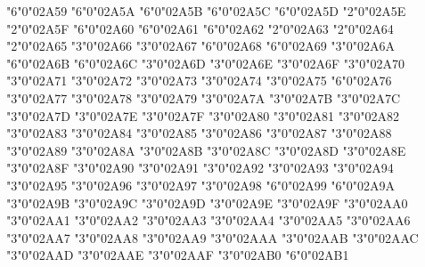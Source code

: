 \mchardef\veeonwedge"6"0"02A59
\mchardef\wedgemidvert"6"0"02A5A
\mchardef\veemidvert"6"0"02A5B
\mchardef\midbarwedge"6"0"02A5C
\mchardef\midbarvee"6"0"02A5D
\mchardef\doublebarwedge"2"0"02A5E
\mchardef\wedgebar"2"0"02A5F
\mchardef\wedgedoublebar"6"0"02A60
\mchardef\varveebar"6"0"02A61
\mchardef\doublebarvee"6"0"02A62
\mchardef\veedoublebar"2"0"02A63
\mchardef\dsub"2"0"02A64
\mchardef\rsub"2"0"02A65
\mchardef\eqdot"3"0"02A66
\mchardef\dotequiv"3"0"02A67
\mchardef\equivVert"6"0"02A68
\mchardef\equivVvert"6"0"02A69
\mchardef\dotsim"3"0"02A6A
\mchardef\simrdots"6"0"02A6B
\mchardef\simminussim"6"0"02A6C
\mchardef\congdot"3"0"02A6D
\mchardef\asteq"3"0"02A6E
\mchardef\hatapprox"3"0"02A6F
\mchardef\approxeqq"3"0"02A70
\mchardef\eqqplus"3"0"02A71
\mchardef\pluseqq"3"0"02A72
\mchardef\eqqsim"3"0"02A73
\mchardef\Coloneq"3"0"02A74
\mchardef\eqeq"3"0"02A75
\mchardef\eqeqeq"6"0"02A76
\mchardef\ddotseq"3"0"02A77
\mchardef\equivDD"3"0"02A78
\mchardef\ltcir"3"0"02A79
\mchardef\gtcir"3"0"02A7A
\mchardef\ltquest"3"0"02A7B
\mchardef\gtquest"3"0"02A7C
\mchardef\leqslant"3"0"02A7D
\mchardef\geqslant"3"0"02A7E
\mchardef\lesdot"3"0"02A7F
\mchardef\gesdot"3"0"02A80
\mchardef\lesdoto"3"0"02A81
\mchardef\gesdoto"3"0"02A82
\mchardef\lesdotor"3"0"02A83
\mchardef\gesdotol"3"0"02A84
\mchardef\lessapprox"3"0"02A85
\let\loa\lessapprox
\mchardef\gtrapprox"3"0"02A86
\let\goa\gtrapprox
\mchardef\lneq"3"0"02A87
\mchardef\gneq"3"0"02A88
\mchardef\lnapprox"3"0"02A89
\mchardef\gnapprox"3"0"02A8A
\mchardef\lesseqqgtr"3"0"02A8B
\mchardef\gtreqqless"3"0"02A8C
\mchardef\lsime"3"0"02A8D
\let\lse\lsime
\mchardef\gsime"3"0"02A8E
\let\gse\gsime
\mchardef\lsimg"3"0"02A8F
\mchardef\gsiml"3"0"02A90
\mchardef\lgE"3"0"02A91
\mchardef\glE"3"0"02A92
\mchardef\lesges"3"0"02A93
\mchardef\gesles"3"0"02A94
\mchardef\eqslantless"3"0"02A95
\mchardef\eqslantgtr"3"0"02A96
\mchardef\elsdot"3"0"02A97
\mchardef\egsdot"3"0"02A98
\mchardef\eqqless"6"0"02A99
\mchardef\eqqgtr"6"0"02A9A
\mchardef\eqqslantless"3"0"02A9B
\mchardef\eqqslantgtr"3"0"02A9C
\mchardef\simless"3"0"02A9D
\let\sol\simless
\mchardef\simgtr"3"0"02A9E
\let\sog\simgtr
\mchardef\simlE"3"0"02A9F
\mchardef\simgE"3"0"02AA0
\mchardef\Lt"3"0"02AA1
\mchardef\Gt"3"0"02AA2
\mchardef\partialmeetcontraction"3"0"02AA3
\mchardef\glj"3"0"02AA4
\mchardef\gla"3"0"02AA5
\mchardef\ltcc"3"0"02AA6
\mchardef\gtcc"3"0"02AA7
\mchardef\lescc"3"0"02AA8
\mchardef\gescc"3"0"02AA9
\mchardef\smt"3"0"02AAA
\mchardef\lat"3"0"02AAB
\mchardef\smte"3"0"02AAC
\mchardef\late"3"0"02AAD
\mchardef\bumpeqq"3"0"02AAE
\mchardef\preceq"3"0"02AAF
\mchardef\succeq"3"0"02AB0
\mchardef\precneq"6"0"02AB1
